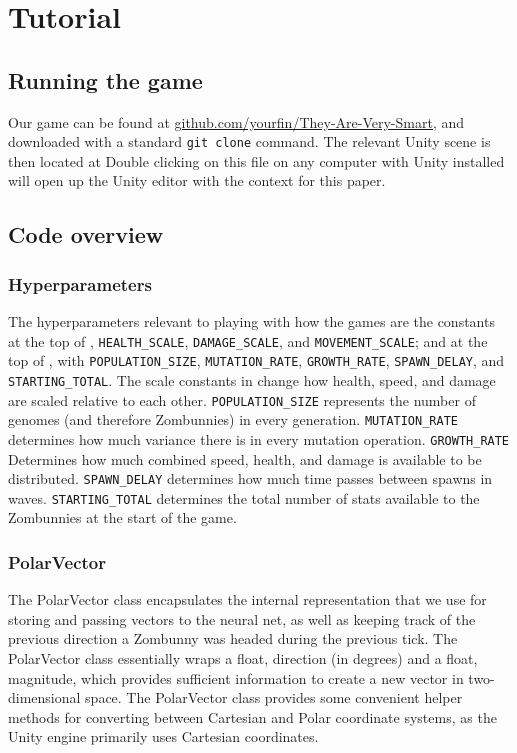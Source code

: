 \documentclass[letterpaper]{article}
\begin{document}
\section{Tutorial}

\subsection{Running the game}
Our game can be found at
\href{https://github.com/YourFin/They-Are-Very-Smart}{github.com/yourfin/They-Are-Very-Smart},
and downloaded with a standard \texttt{git clone} command. The relevant Unity
scene is then located at
Double clicking on this file on any computer with Unity installed will open up
the Unity editor with the context for this paper.

\subsection{Code overview}
\subsubsection{Hyperparameters}
The hyperparameters relevant to playing with how the games are the constants at
the top of , \texttt{HEALTH\_SCALE},
\texttt{DAMAGE\_SCALE}, and \texttt{MOVEMENT\_SCALE}; and at the top of
, with
\texttt{POPULATION\_SIZE}, \texttt{MUTATION\_RATE}, \texttt{GROWTH\_RATE},
\texttt{SPAWN\_DELAY}, and \texttt{STARTING\_TOTAL}. The scale constants in
 change how health, speed, and damage are scaled relative to
each other. \texttt{POPULATION\_SIZE} represents the number of genomes (and
therefore Zombunnies) in every generation. \texttt{MUTATION\_RATE} determines how
much variance there is in every mutation operation. \texttt{GROWTH\_RATE}
Determines how much combined speed, health, and damage is available to be
distributed. \texttt{SPAWN\_DELAY} determines how much time passes between spawns
in waves. \texttt{STARTING\_TOTAL} determines the total number of stats available
to the Zombunnies at the start of the game.

\subsubsection{PolarVector}
The PolarVector class encapsulates the internal representation that we use for
storing and passing vectors to the neural net, as well as keeping track of the
previous direction a Zombunny was headed during the previous tick. The
PolarVector class essentially wraps a float, direction (in degrees) and a float,
magnitude, which provides sufficient information to create a new vector in
two-dimensional space. The PolarVector class provides some convenient helper
methods for converting between Cartesian and Polar coordinate systems, as the
Unity engine primarily uses Cartesian coordinates.
\end{document}
